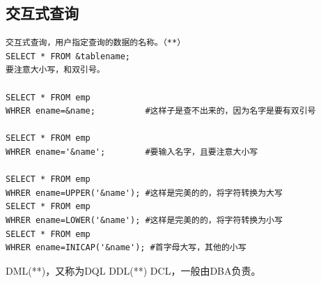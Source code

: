 \subsection{交互式查询}
\begin{verbatim}
交互式查询，用户指定查询的数据的名称。（**）
SELECT * FROM &tablename;
要注意大小写，和双引号。

SELECT * FROM emp
WHRER ename=&name;          #这样子是查不出来的，因为名字是要有双引号

SELECT * FROM emp
WHRER ename='&name';        #要输入名字，且要注意大小写

SELECT * FROM emp
WHRER ename=UPPER('&name'); #这样是完美的的，将字符转换为大写
SELECT * FROM emp
WHRER ename=LOWER('&name'); #这样是完美的的，将字符转换为小写
SELECT * FROM emp
WHRER ename=INICAP('&name'); #首字母大写，其他的小写
\end{verbatim}

DML(**)，又称为DQL
DDL(**)
DCL，一般由DBA负责。